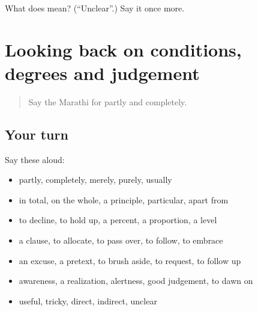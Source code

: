 \begin{tcolorbox}[breakable,colback=teal!4,colframe=teal!35!black,title={Before you move on}]
What does  mean? (\textquotedblleft{}Unclear\textquotedblright{}.) Say it once more.
\end{tcolorbox}
\section[(dialogue)]{Looking back on conditions, degrees and judgement}

\label{lesson:MR-R395-review-389-395}



\begin{quote}
Say the Marathi for partly and completely.
\end{quote}

\subsection*{Your turn}
Say these aloud:

\begin{itemize}
\raggedright
  \item partly, completely, merely, purely, usually
  \item in total, on the whole, a principle, particular, apart from
  \item to decline, to hold up, a percent, a proportion, a level
  \item a clause, to allocate, to pass over, to follow, to embrace
  \item an excuse, a pretext, to brush aside, to request, to follow up
  \item awareness, a realization, alertness, good judgement, to dawn on
  \item useful, tricky, direct, indirect, unclear
\end{itemize}

